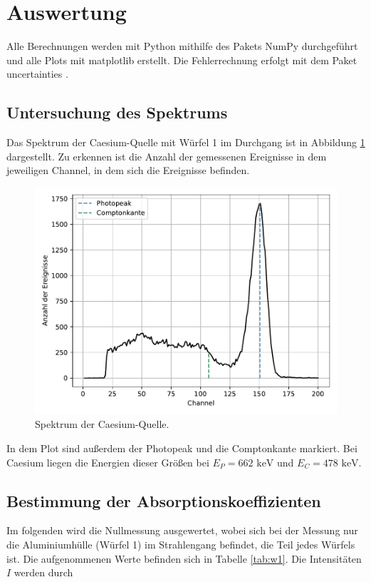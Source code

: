 \newpage
\section{Auswertung}
\label{sec:Auswertung}

\noindent
Alle Berechnungen werden mit Python mithilfe des Pakets NumPy \cite{numpy} durchgeführt und alle Plots mit matplotlib \cite{matplotlib} erstellt.
Die Fehlerrechnung erfolgt mit dem Paket uncertainties \cite{uncertainties}.

\subsection{Untersuchung des Spektrums}

\noindent
Das Spektrum der Caesium-Quelle mit Würfel 1 im Durchgang ist in Abbildung \ref{fig:spektrum} dargestellt. 
Zu erkennen ist die Anzahl der gemessenen Ereignisse in dem jeweiligen Channel, in dem sich die Ereignisse befinden.

\begin{figure}
  \centering
  \includegraphics[width=\textwidth]{data/spektrum.pdf}
  \caption{Spektrum der Caesium-Quelle.}
  \label{fig:spektrum}
\end{figure}

\noindent
In dem Plot sind außerdem der Photopeak und die Comptonkante markiert.
Bei Caesium liegen die Energien dieser Größen bei $E_{P} = 662 \text{ keV}$ und $E_{C} = 478 \text{ keV}$.

\newpage
\subsection{Bestimmung der Absorptionskoeffizienten}
\noindent
Im folgenden wird die Nullmessung ausgewertet, wobei sich bei der Messung nur die Aluminiumhülle (Würfel 1) im Strahlengang befindet, die Teil jedes Würfels ist.
Die aufgenommenen Werte befinden sich in Tabelle \ref{tab:w1}.
Die Intensitäten $I$ werden durch

